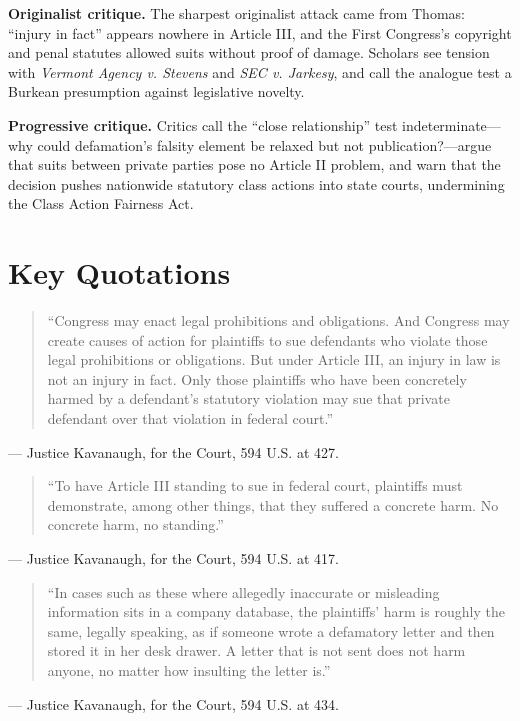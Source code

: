 \documentclass[12pt]{article}
\begin{document}
\textbf{Originalist critique.} The sharpest originalist attack came from Thomas: ``injury in fact'' appears nowhere in Article III, and the First Congress's copyright and penal statutes allowed suits without proof of damage. Scholars see tension with \textit{Vermont Agency v. Stevens} and \textit{SEC v. Jarkesy}, and call the analogue test a Burkean presumption against legislative novelty.

\textbf{Progressive critique.} Critics call the ``close relationship'' test indeterminate---why could defamation's falsity element be relaxed but not publication?---argue that suits between private parties pose no Article II problem, and warn that the decision pushes nationwide statutory class actions into state courts, undermining the Class Action Fairness Act.

\section{Key Quotations}

\begin{quote}
``Congress may enact legal prohibitions and obligations. And Congress may create causes of action for plaintiffs to sue defendants who violate those legal prohibitions or obligations. But under Article III, an injury in law is not an injury in fact. Only those plaintiffs who have been concretely harmed by a defendant's statutory violation may sue that private defendant over that violation in federal court.''
\end{quote}
\noindent --- Justice Kavanaugh, for the Court, 594 U.S. at 427.

\begin{quote}
``To have Article III standing to sue in federal court, plaintiffs must demonstrate, among other things, that they suffered a concrete harm. No concrete harm, no standing.''
\end{quote}
\noindent --- Justice Kavanaugh, for the Court, 594 U.S. at 417.

\begin{quote}
``In cases such as these where allegedly inaccurate or misleading information sits in a company database, the plaintiffs' harm is roughly the same, legally speaking, as if someone wrote a defamatory letter and then stored it in her desk drawer. A letter that is not sent does not harm anyone, no matter how insulting the letter is.''
\end{quote}
\noindent --- Justice Kavanaugh, for the Court, 594 U.S. at 434.
\end{document}
